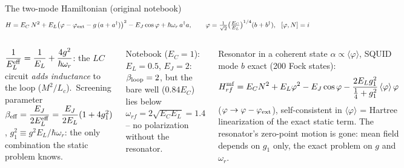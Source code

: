 \documentclass[aspectratio=169,10pt]{beamer}
\begin{document}
\begin{frame}{The two-mode Hamiltonian (original notebook)}
  \vspace{-1mm}
  {\small\[
    H=E_C\,N^2+E_L\big(\varphi-\varphi_{\rm ext}-g\,(a+a^\dagger)\big)^2-E_J\cos\varphi+\hbar\omega_r\,a^\dagger a,
    \qquad \varphi=\tfrac{1}{\sqrt2}\big(\tfrac{E_C}{E_L}\big)^{1/4}(b+b^\dagger),\ \ [\varphi,N]=i
  \]}
  \vspace{-4mm}
  \begin{columns}[T]
    \begin{keybox}[title={Resonator seen statically (minimize over $a+a^\dagger$)}]
      \footnotesize $\dfrac{1}{E_L^{\rm eff}}=\dfrac{1}{E_L}+\dfrac{4g^2}{\hbar\omega_r}$: the $LC$ circuit \emph{adds inductance}
      to the loop ($M^2/L_c$).\ Screening parameter
      $\beta_{\rm eff}=\dfrac{E_J}{2E_L^{\rm eff}}=\dfrac{E_J}{2E_L}(1+4g_1^2)$, $g_1^2\equiv g^2E_L/\hbar\omega_r$:
      the only combination the static problem knows.
    \end{keybox}
    \footnotesize Notebook ($E_C=1$): $E_L=0.5$, $E_J=2$: $\beta_{\rm loop}=2$, but the bare well ($0.84E_C$) lies below
    $\omega_{rf}=2\sqrt{E_CE_L}=1.4$ -- no polarization without the resonator.
    \begin{keybox}[title={Mean field of the notebook: $|{\rm GS}\rangle=|\psi_{rf}\rangle|\psi_{ph}\rangle$}]
      \footnotesize Resonator in a coherent state $\alpha\propto\langle\varphi\rangle$, SQUID mode $b$ exact (200 Fock states):
      \[
        H^{\rm mf}_{rf}=E_CN^2+E_L\varphi^2-E_J\cos\varphi-\frac{2E_Lg_1^2}{\tfrac14+g_1^2}\,\langle\varphi\rangle\,\varphi
      \]
      ($\varphi\to\varphi-\varphi_{\rm ext}$), self-consistent in $\langle\varphi\rangle$ = Hartree linearization of the exact
      static term. The resonator's zero-point motion is gone: mean field depends on $g_1$ only, the exact problem on $g$ and $\omega_r$.
    \end{keybox}
  \end{columns}
\end{frame}
\end{document}
